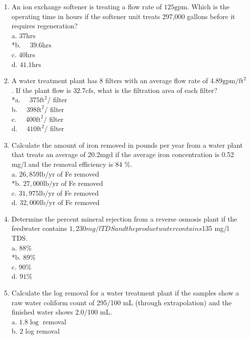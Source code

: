 \begin{enumerate}
  \item An ion exchange softener is treating a flow rate of $125 \mathrm{gpm}$. Which is the operating time in hours if the softener unit treats 297,000 gallons before it requires regeneration?\\
a. $37 \mathrm{hrs}$\\
*b. $\quad 39.6 \mathrm{hrs}$\\
c. $40 \mathrm{hrs}$\\
d. $41.1 \mathrm{hrs}$ 
\item A water treatment plant has 8 filters with an average flow rate of $4.89 \mathrm{gpm} / \mathrm{ft}^{2}$. If the plant flow is $32.7 \mathrm{cfs}$, what is the filtration area of each filter?\\
*a. $\quad 375 \mathrm{ft}^{2} /$ filter\\
b. $\quad 398 \mathrm{ft}^{2} /$ filter\\
c. $\quad 400 \mathrm{ft}^{2} /$ filter\\
d. $\quad 410 \mathrm{ft}^{2} /$ filter\\
  \item Calculate the amount of iron removed in pounds per year from a water plant that treats an average of $20.2 \mathrm{mgd}$ if the average iron concentration is 0.52 mg/l and the removal efficiency is 84 \%.\\
a. $26,859 \mathrm{lb} / \mathrm{yr}$ of Fe removed\\
*b. $27,000 \mathrm{lb} / \mathrm{yr}$ of Fe removed\\
c. $31,975 \mathrm{lb} / \mathrm{yr}$ of Fe removed\\
d. $32,000 \mathrm{lb} / \mathrm{yr}$ of Fe removed\\
  \item Determine the percent mineral rejection from a reverse osmosis plant if the feedwater contains $1,230 mg/l TDS and the product water contains $135 mg/l TDS.\\
a. $88 \%$\\
*b. $89 \%$\\
c. $90 \%$\\
d. $91 \%$\\
  \item Calculate the log removal for a water treatment plant if the samples show a raw water coliform count of 295/100 $\mathrm{mL}$ (through extrapolation) and the finished water shows 2.0/100 mL.\\
a. $1.8 \log$ removal\\
b. 2 log removal\\

\end{enumerate}
